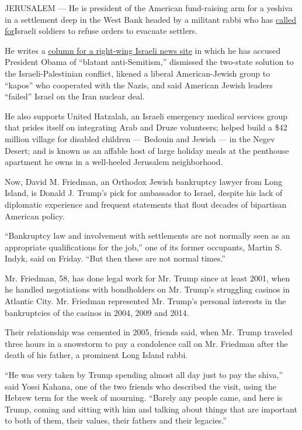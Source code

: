JERUSALEM --- He is president of the American fund-raising arm for a
yeshiva in a settlement deep in the West Bank headed by a militant rabbi
who has
\href{http://www.israelhayom.com/site/newsletter_article.php?id=230}{called
for}Israeli soldiers to refuse orders to evacuate settlers.

He writes a
\href{http://www.nytimes3xbfgragh.onion/interactive/2016/12/16/world/middleeast/David-Friedman-Israel-Palestinians-Trump-quotes.html?hp\&action=click\&pgtype=Homepage\&clickSource=story-heading\&module=second-column-region\&region=top-news\&WT.nav=top-news}{column
for a right-wing Israeli news site} in which he has accused President
Obama of ``blatant anti-Semitism,'' dismissed the two-state solution to
the Israeli-Palestinian conflict, likened a liberal American-Jewish
group to ``kapos'' who cooperated with the Nazis, and said American
Jewish leaders ``failed'' Israel on the Iran nuclear deal.

He also supports United Hatzalah, an Israeli emergency medical services
group that prides itself on integrating Arab and Druze volunteers;
helped build a \$42 million village for disabled children --- Bedouin
and Jewish --- in the Negev Desert; and is known as an affable host of
large holiday meals at the penthouse apartment he owns in a well-heeled
Jerusalem neighborhood.

Now, David M. Friedman, an Orthodox Jewish bankruptcy lawyer from Long
Island, is Donald J. Trump's pick for ambassador to Israel, despite his
lack of diplomatic experience and frequent statements that flout decades
of bipartisan American policy.

``Bankruptcy law and involvement with settlements are not normally seen
as an appropriate qualifications for the job,'' one of its former
occupants, Martin S. Indyk, said on Friday. ``But then these are not
normal times.''

Mr. Friedman, 58, has done legal work for Mr. Trump since at least 2001,
when he handled negotiations with bondholders on Mr. Trump's struggling
casinos in Atlantic City. Mr. Friedman represented Mr. Trump's personal
interests in the bankruptcies of the casinos in 2004, 2009 and 2014.

Their relationship was cemented in 2005, friends said, when Mr. Trump
traveled three hours in a snowstorm to pay a condolence call on Mr.
Friedman after the death of his father, a prominent Long Island rabbi.

``He was very taken by Trump spending almost all day just to pay the
shiva,'' said Yossi Kahana, one of the two friends who described the
visit, using the Hebrew term for the week of mourning. ``Barely any
people came, and here is Trump, coming and sitting with him and talking
about things that are important to both of them, their values, their
fathers and their legacies.''

